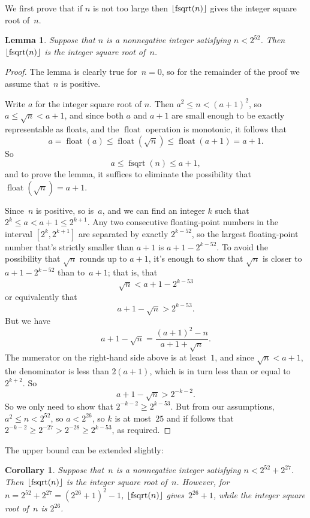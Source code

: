 \documentclass[a4paper]{article}
\DeclarePairedDelimiter\floor{\lfloor}{\rfloor}
\DeclareMathOperator{\fsqrt}{fsqrt}
\DeclareMathOperator{\float}{float}
\theoremstyle{plain}
\newtheorem{lemma}[theorem]{Lemma}
\newtheorem{corollary}[theorem]{Corollary}
\theoremstyle{definition}
\begin{document}
We first prove that if $n$ is not too large then $\floor{\fsqrt(n)}$ gives the
integer square root of~$n$.

\begin{lemma}
  Suppose that $n$ is a nonnegative integer satisfying $n < 2^{52}$. Then
  $\floor{\fsqrt(n)}$ is the integer square root of~$n$.
\end{lemma}

\begin{proof}
  The lemma is clearly true for~$n=0$, so for the remainder of the proof
  we assume that~$n$ is positive.

  Write $a$ for the integer square root of $n$. Then $a^2 \le n < (a + 1)^2$,
  so $a \le \sqrt n < a + 1$, and since both $a$ and $a + 1$ are small
  enough to be exactly representable as floats, and the $\float$ operation
  is monotonic, it follows that
  $$a = \float(a) \le \float(\sqrt n) \le \float(a + 1) = a + 1.$$
  So
  $$a \le \fsqrt(n) \le a + 1,$$
  and to prove the lemma, it suffices to eliminate
  the possibility that~$\float(\sqrt n) = a + 1$.

  Since~$n$ is positive, so is~$a$, and we can find an integer $k$ such that
  $2^k \le a < a + 1 \le 2^{k + 1}$. Any two consecutive floating-point numbers
  in the interval $[2^k, 2^{k+1}]$ are separated by exactly $2^{k-52}$, so the
  largest floating-point number that's strictly smaller than $a + 1$ is $a + 1
  - 2^{k - 52}.$ To avoid the possibility that $\sqrt n$ rounds up to $a + 1$,
  it's enough to show that $\sqrt n$ is closer to $a + 1 - 2^{k-52}$ than to~$a
  + 1$; that is, that
  $$\sqrt n < a + 1 - 2^{k-53}$$
  or equivalently that
  $$a + 1 - \sqrt n > 2^{k - 53}.$$
  But we have
  $$a + 1 - \sqrt n = \frac{(a + 1)^2 - n}{a + 1 + \sqrt n}.$$
  The numerator on the right-hand side above is at least~$1$, and since $\sqrt
  n < a + 1$, the denominator is less than $2(a+1)$, which is in turn less than
  or equal to $2^{k+2}$. So
  $$a + 1 - \sqrt n > 2^{-k-2}.$$ So we only need to show that $2^{-k-2} \ge
  2^{k-53}$. But from our assumptions, $a^2 \le n < 2^{52}$, so $a < 2^{26}$,
  so $k$ is at most~$25$ and if follows that $2^{-k-2} \ge 2^{-27} > 2^{-28}
  \ge 2^{k-53}$, as required.
\end{proof}

The upper bound can be extended slightly:

\begin{corollary}
  Suppose that~$n$ is a nonnegative integer satisfying $n < 2^{52} + 2^{27}$.
  Then $\floor{\fsqrt(n)}$ is the integer square root of~$n$. However, for~$n =
  2^{52} + 2^{27} = (2^{26} + 1)^2 - 1$, $\floor{\fsqrt(n)}$ gives~$2^{26} +
  1$, while the integer square root of~$n$ is $2^{26}$.
\end{corollary}
\end{document}

